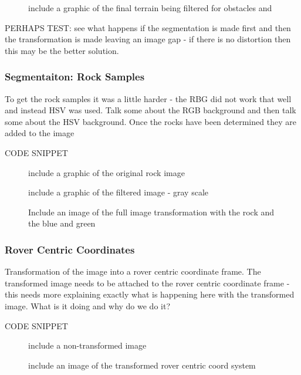 \documentclass[a4paper]{article}
\begin{document}
\begin{figure}
\centering
\caption{include a graphic of the final terrain being filtered for obstacles and }
\end{figure}

PERHAPS TEST: see what happens if the segmentation is made first and then the transformation is made leaving an image gap - if there is no distortion then this may be the better solution.

\subsubsection{Segmentaiton: Rock Samples}
To get the rock samples it was a little harder - the RBG did not work that well and instead HSV was used. Talk some about the RGB background and then talk some about the HSV background. Once the rocks have been determined they are added to the image

CODE SNIPPET

\begin{figure}
\begin{minipage}{0.45\linewidth}
\centering
\caption{include a graphic of the original rock image}
\end{minipage}
\begin{minipage}{0.45\linewidth}
\centering
\caption{include a graphic of the filtered image - gray scale}
\end{minipage}
\end{figure}

\begin{figure}
\centering
\caption{Include an image of the full image transformation with the rock and the blue and green}
\end{figure}

\subsubsection{Rover Centric Coordinates}
Transformation of the image into a rover centric coordinate frame. The transformed image needs to be attached to the rover centric coordinate frame - this needs more explaining exactly what is happening here with the transformed image. What is it doing and why do we do it?

CODE SNIPPET

\begin{figure}
\begin{minipage}{0.45\linewidth}
\centering
\caption{include a non-transformed image}
\end{minipage}
\begin{minipage}{0.45\linewidth}
\centering
\caption{include an image of the transformed rover centric coord system}
\end{minipage}
\end{figure}
\end{document}
